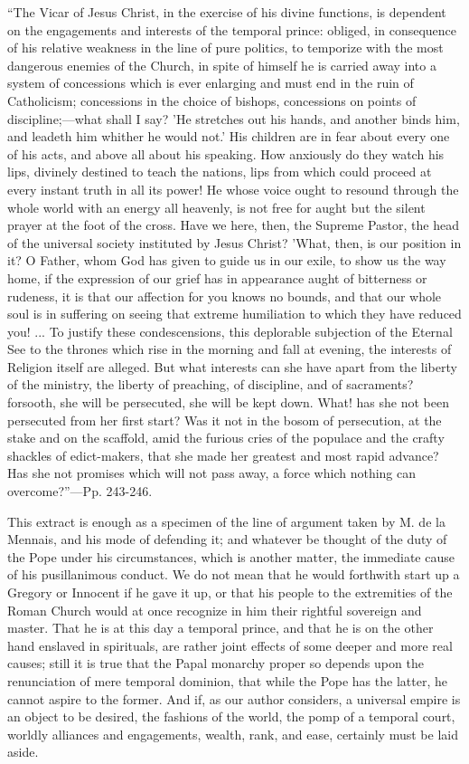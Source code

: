 ``The Vicar of Jesus
Christ, in the exercise of his divine functions, is dependent on the
engagements and interests of the temporal prince: obliged, in
consequence of his relative weakness in the line of pure politics, to
temporize with the most dangerous enemies of the Church, in spite of
himself he is carried away into a system of concessions which is ever
enlarging and must end in the ruin of Catholicism; concessions in the
choice of bishops, concessions on points of discipline;—what shall I
say? 'He stretches out his hands, and another binds him, and leadeth
him whither he would not.' His children are in fear about every one of
his acts, and above all about his speaking. How anxiously do they
watch his lips, divinely destined to teach the nations, lips from
which could proceed at every instant truth in all its power! He whose
voice ought to resound through the whole world with an energy all
heavenly, is not free for aught but the silent prayer at the foot of
the cross. Have we here, then, the Supreme Pastor, the head of the
universal society instituted by Jesus Christ? 'What, then, is our
position in it? O Father, whom God has given to guide us in our exile,
to show us the way home, if the expression of our grief has in
appearance aught of bitterness or rudeness, it is that our affection
for you knows no bounds, and that our whole soul is in suffering on
seeing that extreme humiliation to which they have reduced you! ... To
justify these condescensions, this deplorable subjection of the
Eternal See to the thrones which rise in the morning and fall at
evening, the interests of Religion itself are alleged. But what
interests can she have apart from the liberty of the ministry, the
liberty of preaching, of discipline, and of sacraments? forsooth, she
will be persecuted, she will be kept down. What! has she not been
persecuted from her first start? Was it not in the bosom of
persecution, at the stake and on the scaffold, amid the furious cries
of the populace and the crafty shackles of edict-makers, that she made
her greatest and most rapid advance? Has she not promises which will
not pass away, a force which nothing can overcome?''—Pp. 243-246.

This extract is enough as a specimen of the line
of argument taken by M. de la Mennais, and his mode of defending it;
and whatever be thought of the duty of the Pope under his
circumstances, which is another matter, the immediate cause of
his pusillanimous conduct. We do not mean that he would forthwith
start up a Gregory or Innocent if he gave it up, or that his people to
the extremities of the Roman Church would at once recognize in him
their rightful sovereign and master. That he is at this day a temporal
prince, and that he is on the other hand enslaved in spirituals, are
rather joint effects of some deeper and more real causes; still it is
true that the Papal monarchy proper so depends upon the renunciation
of mere temporal dominion, that while the Pope has the latter, he
cannot aspire to the former. And if, as our author considers, a
universal empire is an object to be desired, the fashions of the
world, the pomp of a temporal court, worldly alliances and
engagements, wealth, rank, and ease, certainly must be laid aside.

